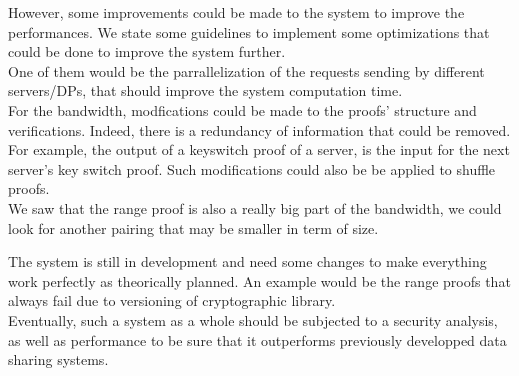 \documentclass{article}
\begin{document}
However, some improvements could be made to the system to improve the performances.  We state some guidelines to implement some optimizations that could be done to improve the system further.\\

One of them would be the parrallelization of the requests sending by different servers/DPs, that should improve the system computation time.\\
For the bandwidth, modfications could be made to the proofs' structure and verifications. Indeed, there is a redundancy of information that could be removed. For example, the output of a keyswitch proof of a server, is the input for the next server's key switch proof. Such modifications could also be be applied to shuffle proofs.\\
We saw that the range proof is also a really big part of the bandwidth, we could look for another pairing that may be smaller in term of size.

The system is still in development and need some changes to make everything work perfectly as theorically planned. An example would be the range proofs that always fail due to versioning of cryptographic library.\\

Eventually, such a system as a whole should be subjected to a security analysis, as well as performance to be sure that it outperforms previously developped data sharing systems.
\end{document}
